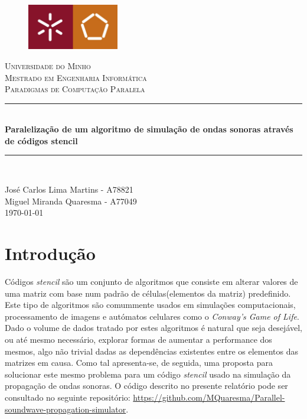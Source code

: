 \documentclass{article}
\begin{document}
\begin{titlepage}
    \center
    \begin{figure}[H]
        \centering
        \includegraphics[width=4cm]{UM_EENG.jpg}
    \end{figure}
    \textsc{\LARGE Universidade do Minho} \\ [1.5cm]
    \textsc{\Large Mestrado em Engenharia Informática} \\ [0.5cm]
    \textsc{\large Paradigmas de Computação Paralela} \\ [0.5cm]
    
    \vspace*{1cm}
    
    \rule{\linewidth}{0.5mm} \\ [0.25cm]
    {\huge \bfseries Paralelização de um algoritmo de simulação de ondas sonoras através de códigos stencil}
    \rule{\linewidth}{0.5mm} \\ [0.25cm]
    
    \vspace*{1cm}

    José Carlos Lima Martins - A78821 \\
    Miguel Miranda Quaresma - A77049 \\ [0.25cm]

    \today
\end{titlepage}

\newpage

\tableofcontents

\newpage

\section{Introdução}
Códigos \textit{stencil} são um conjunto de algoritmos que consiste em alterar valores de uma matriz com base num padrão de células(elementos da matriz) predefinido.
Este tipo de algoritmos são comummente usados em simulações computacionais, processamento de imagens e autómatos celulares como o \textit{Conway's Game of Life}.
Dado o volume de dados tratado por estes algoritmos é natural que seja desejável, ou até mesmo necessário, explorar formas de aumentar a performance dos mesmos, 
algo não trivial dadas as dependências existentes entre os elementos das matrizes em causa. 
Como tal apresenta-se, de seguida, uma proposta para solucionar este mesmo problema para um código \textit{stencil} usado na simulação da propagação de ondas sonoras. O código descrito no presente relatório pode ser consultado no seguinte repositório: \url{https://github.com/MQuaresma/Parallel-soundwave-propagation-simulator}.
\end{document}
